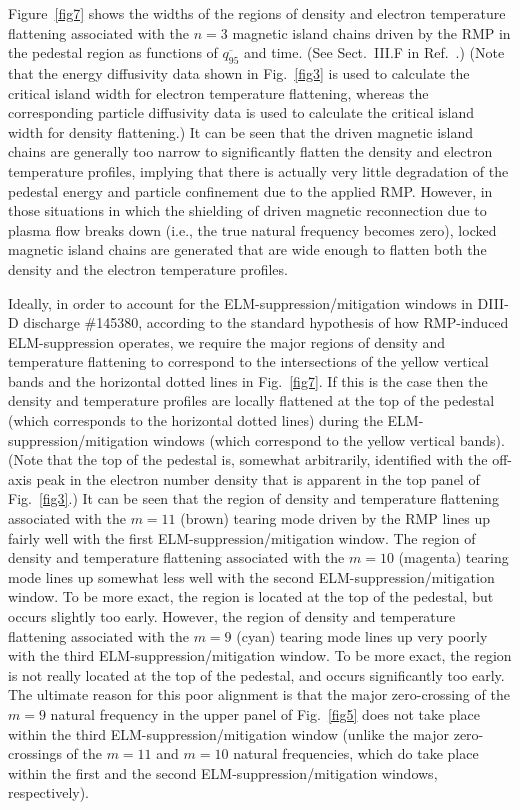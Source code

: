\documentclass[12pt,prb,aps]{revtex4-1}
\begin{document}
Figure~\ref{fig7} shows the widths of the regions of density and electron temperature flattening associated with the $n=3$ magnetic
island chains driven by the RMP in the pedestal region as functions of $\overline{q_{95}}$ and time. (See Sect.~III.F in Ref.~.) (Note that the energy diffusivity data shown in Fig.~\ref{fig3}  is used to calculate the
critical island width for electron temperature flattening, whereas the corresponding particle diffusivity data is used to calculate
the critical island width for density flattening.\cite{flat}) It can be seen that the driven magnetic island chains are generally too narrow
to significantly flatten the density and electron temperature profiles,  implying that there is actually very little degradation of the pedestal energy and particle confinement
due to the applied RMP. 
However, in those situations in which the shielding of driven
magnetic reconnection due to plasma flow breaks down (i.e., the true natural frequency becomes zero), locked magnetic island chains are generated that are
 wide enough to flatten both the density and the electron temperature profiles. 
 
 Ideally, in order to account for the
ELM-suppression/mitigation windows in DIII-D discharge \#145380, according to the standard
hypothesis of how RMP-induced ELM-suppression operates, we require the major regions of density and temperature
flattening to correspond to the intersections of the yellow vertical bands and the horizontal dotted lines in Fig.~\ref{fig7}. If this is the case then
the density and temperature profiles are locally flattened at the top of the pedestal (which corresponds to
the horizontal dotted lines) during the ELM-suppression/mitigation windows (which correspond to the yellow vertical bands). (Note that the top of the pedestal
is, somewhat arbitrarily, identified with the off-axis peak in the electron number density that is apparent in the top panel of Fig.~\ref{fig3}.) It can be seen
that the region of density and temperature flattening associated with the $m=11$ (brown) tearing mode driven by the RMP lines up fairly well with the
first ELM-suppression/mitigation window. The region of density and temperature flattening associated with the $m=10$ (magenta) tearing mode 
lines up somewhat less well with the second ELM-suppression/mitigation window. To be more exact, the region is located at the top of the pedestal,
but occurs slightly too early. However, the 
region of density and temperature flattening associated with the $m=9$ (cyan) tearing mode 
lines up very poorly with the third ELM-suppression/mitigation window. To be more exact, the region is not really located at the top of the pedestal, and occurs
significantly too early. The ultimate reason for this poor alignment is that the major zero-crossing of the $m=9$ natural
frequency in the upper panel of Fig.~\ref{fig5} does not take place within the third ELM-suppression/mitigation window (unlike the
major zero-crossings of the $m=11$ and $m=10$ natural frequencies, which do take place within the first and the second
ELM-suppression/mitigation windows, respectively). 
\end{document}

